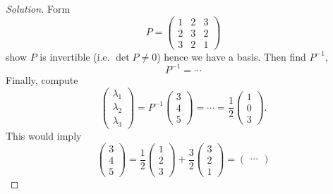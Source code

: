 \documentclass[10pt, a4paper]{article}
\begin{document}
\begin{example}
    \begin{proof}[Solution]\renewcommand{\qedsymbol}{$\triangle$}
        Form
        \[
        P = \begin{pmatrix}
            1 & 2 & 3 \\
            2 & 3 & 2 \\
            3 & 2 & 1
        \end{pmatrix}
        \]
        show $P$ is invertible
        (i.e. $\det{P} \neq 0$)
        hence we have a basis.
        Then find $P ^ {-1}$,
        \[
        P ^ {-1} = \dotsi
        \]
        Finally,
        compute
        \[
        \begin{pmatrix}
            \lambda_1 \\ \lambda_2 \\ \lambda_3
        \end{pmatrix}
        = P ^ {-1}\begin{pmatrix}
            3 \\ 4 \\ 5
        \end{pmatrix} = \dotsi = \frac{1}{2}\begin{pmatrix}
            1 \\ 0 \\ 3
        \end{pmatrix}.
        \]
        This would imply
        \[
        \begin{pmatrix}
            3 \\ 4 \\ 5
        \end{pmatrix} = \frac{1}{2}\begin{pmatrix}
            1 \\ 2 \\ 3
        \end{pmatrix}
        + \frac{3}{2}\begin{pmatrix}
            3 \\ 2 \\ 1
        \end{pmatrix}
        =
        \begin{pmatrix}
            \dotsi
        \end{pmatrix}
        \]
    \end{proof}
\end{example}

\newpage
\end{document}
